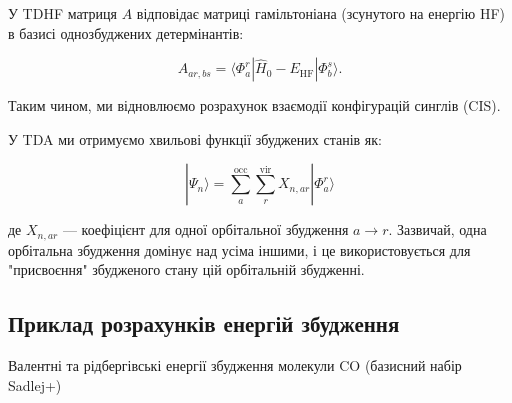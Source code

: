 \documentclass{PySCFBook}
\begin{document}
У TDHF матриця \(A\) відповідає матриці гамільтоніана (зсунутого на енергію HF) в базисі однозбуджених детермінантів:

\[A_{ar,bs} = \langle \Phi_a^r | \hat{H}_0 - E_{\text{HF}} | \Phi_b^s \rangle.\]

Таким чином, ми відновлюємо розрахунок взаємодії конфігурацій синглів (CIS).

У TDA ми отримуємо хвильові функції збуджених станів як:

\[|\Psi_n\rangle = \sum_a^{\text{occ}} \sum_r^{\text{vir}} X_{n,ar} |\Phi_a^r\rangle\]

де \(X_{n,ar}\) — коефіцієнт для одної орбітальної збудження \(a \to r\). Зазвичай, одна орбітальна збудження домінує над усіма іншими, і це використовується для "присвоєння" збудженого стану цій орбітальній збудженні.

\subsection{Приклад розрахунків енергій збудження}

Валентні та рідбергівські енергії збудження молекули CO (базисний набір Sadlej+)
\end{document}
